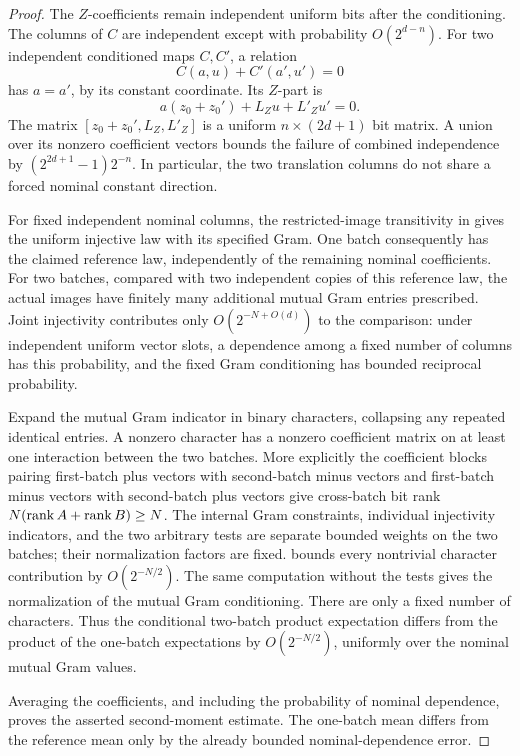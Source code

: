 \begin{proof}
The \(Z\)-coefficients remain independent uniform bits after
the conditioning.  The columns of \(C\) are independent
except with probability \(O(2^{d-n})\).
For two independent conditioned maps \(C,C'\), a relation
\[
 C(a,u)+C'(a',u')=0
 \]
has \(a=a'\), by its constant coordinate.  Its \(Z\)-part is
\[
 a(z_0+z_0')+L_Zu+L'_Zu'=0.
 \]
The matrix \([z_0+z_0',L_Z,L'_Z]\) is a uniform
\(n\times(2d+1)\) bit matrix.  A union over its nonzero
coefficient vectors bounds the failure of combined independence
by \((2^{2d+1}-1)2^{-n}\).
In particular, the two translation columns do not share a
forced nominal constant direction.

For fixed independent nominal columns, the restricted-image
transitivity in  gives the uniform
injective law with its specified Gram.  One batch consequently
has the claimed reference law, independently of the remaining
nominal coefficients.
For two batches, compared with two independent copies of this
reference law, the actual images have finitely many additional
mutual Gram entries prescribed.  Joint injectivity contributes
only \(O(2^{-N+O(d)})\) to the comparison: under independent
uniform vector slots, a dependence among a fixed number of
columns has this probability, and the fixed Gram conditioning
has bounded reciprocal probability.

Expand the mutual Gram indicator in binary characters, collapsing
any repeated identical entries.  A nonzero character has a
nonzero coefficient matrix on at least one interaction between
the two batches.  More explicitly the coefficient blocks pairing
first-batch plus vectors with second-batch minus vectors and
first-batch minus vectors with second-batch plus vectors give
cross-batch bit rank
\(N(\operatorname{rank} A+\operatorname{rank} B)\ge N\).
The internal Gram constraints, individual injectivity indicators,
and the two arbitrary tests are separate bounded weights on
the two batches; their normalization factors are fixed.
 bounds every nontrivial character contribution
by \(O(2^{-N/2})\).  The same computation without the tests
gives the normalization of the mutual Gram conditioning.
There are only a fixed number of characters.  Thus the
conditional two-batch product expectation differs from the
product of the one-batch expectations by \(O(2^{-N/2})\),
uniformly over the nominal mutual Gram values.

Averaging the coefficients, and including the probability of
nominal dependence, proves the asserted second-moment estimate.
The one-batch mean differs from the reference mean only by
the already bounded nominal-dependence error.
\end{proof}

